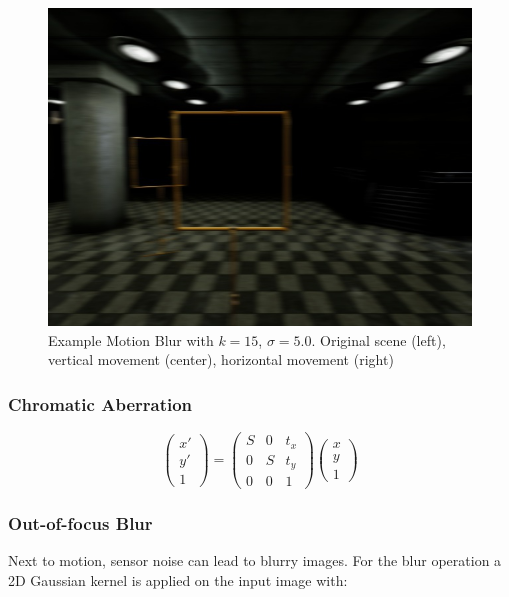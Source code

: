 \begin{figure}[htbp]
\begin{minipage}{0.33\textwidth}
		\includegraphics[width=\textwidth]{fig/gate_example_motionblur_h}
	\end{minipage}
	\caption{Example Motion Blur with $k=15$, $\sigma=5.0$. Original scene (left), vertical movement (center), horizontal movement (right)}
	\label{fig:motionblur}
\end{figure}

\subsubsection{Chromatic Aberration}

\begin{equation}
	\begin{pmatrix}
	x' \\
	y' \\
	1
	\end{pmatrix} = \begin{pmatrix}
	S & 0 & t_x \\
	0 & S & t_y \\
	0 & 0 & 1
	\end{pmatrix} \begin{pmatrix}
	x \\
	y \\
	1
	\end{pmatrix}
\end{equation}
\subsubsection{Out-of-focus Blur}

Next to motion, sensor noise can lead to blurry images. For the blur operation a 2D Gaussian kernel is applied on the input image with:

